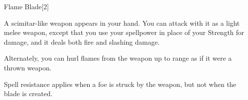 \begin{spellsection}{Flame Blade}[2]
    \begin{spellheader}
    \end{spellheader}
    \begin{spellcontent}
        \begin{spelleffects}
            \spelleffect A scimitar-like weapon appears in your hand. You can attack with it as a light melee weapon, except that you use your spellpower in place of your Strength for damage, and it deals both fire and slashing damage.

            Alternately, you can hurl flames from the weapon up to \rngmed range as if it were a thrown weapon.
            \spelldur \durlong \dismissable
        \end{spelleffects}
    \end{spellcontent}
    \begin{spellfooter}
        \spellnotes Spell resistance applies when a foe is struck by the weapon, but not when the blade is created.
        \firespellnotes
        \miscastexplode
    \end{spellfooter}
    \begin{spellaugments}
    \end{spellaugments}
\end{spellsection}

